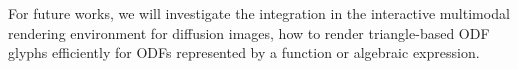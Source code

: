 \documentclass[twoside,twocolumn,10pt]{article}
\begin{document}
For future works, we will investigate the integration in the interactive multimodal rendering environment for diffusion images, how to render triangle-based ODF glyphs efficiently for ODFs represented by a function or algebraic expression.























\end{document}
